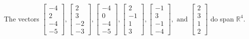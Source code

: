 \begin{exercise}
\begin{exerciseStatement}
  \end{exerciseStatement}
  \begin{exerciseAnswer}
   The vectors \(\left[\begin{array}{r}
-4 \\
2 \\
-4 \\
-5
\end{array}\right] , \left[\begin{array}{r}
2 \\
3 \\
-2 \\
-3
\end{array}\right] , \left[\begin{array}{r}
-4 \\
0 \\
-4 \\
-5
\end{array}\right] , \left[\begin{array}{r}
2 \\
-1 \\
1 \\
3
\end{array}\right] , \left[\begin{array}{r}
-1 \\
3 \\
-1 \\
-4
\end{array}\right] , \text{ and } \left[\begin{array}{r}
2 \\
3 \\
1 \\
2
\end{array}\right]\) 
  	 do  
	span \(\mathbb{R}^4\).
  


  \end{exerciseAnswer}
\end{exercise}